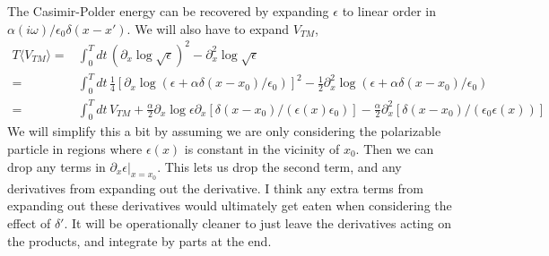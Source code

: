 The Casimir-Polder energy can be recovered by expanding $\epsilon$ to linear order in $\alpha(i\omega)/\epsilon_0\delta(x-x').$  We will also have to expand $V_{TM}$,
\begin{align}
T\langle V_{TM}\rangle =& \int_0^Tdt\, (\partial_x\log\sqrt{\epsilon})^2 - \partial_x^2\log\sqrt{\epsilon}\\
=& \int_0^Tdt\, \frac{1}{4}[\partial_x\log(\epsilon + \alpha\delta(x-x_0)/\epsilon_0)]^2 - \frac{1}{2}\partial_x^2\log(\epsilon + \alpha\delta(x-x_0)/\epsilon_0)\\
=& \int_0^Tdt\, V_{TM} +\frac{\alpha}{2}\partial_x\log\epsilon\partial_x[\delta(x-x_0)/(\epsilon(x)\epsilon_0)]
 - \frac{\alpha}{2}\partial_x^2[\delta(x-x_0)/(\epsilon_0\epsilon(x))]
\end{align}
We will simplify this a bit by assuming we are only considering the polarizable particle in regions 
where $\epsilon(x)$ is constant in the vicinity of $x_0$.
  Then we can drop any terms in $\partial_x\epsilon|_{x=x_0}$.
  This lets us drop the second term, and any derivatives from expanding out the derivative.
  I think any extra terms from expanding out these derivatives would ultimately get eaten when
 considering the effect of $\delta'$.
  It will be operationally cleaner to just leave the derivatives acting on the products, 
and integrate by parts at the end. 

